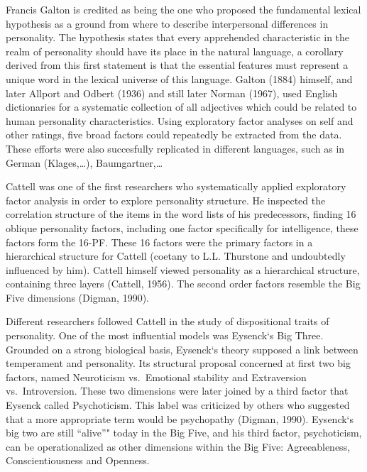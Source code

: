 \documentclass[,man]{apa6}
\theoremstyle{definition}
\theoremstyle{definition}
\theoremstyle{definition}
\theoremstyle{remark}
\begin{document}
Francis Galton is credited as being the one who proposed the fundamental
lexical hypothesis as a ground from where to describe interpersonal
differences in personality. The hypothesis states that every apprehended
characteristic in the realm of personality should have its place in the
natural language, a corollary derived from this first statement is that
the essential features must represent a unique word in the lexical
universe of this language. Galton (1884) himself, and later Allport and
Odbert (1936) and still later Norman (1967), used English dictionaries
for a systematic collection of all adjectives which could be related to
human personality characteristics. Using exploratory factor analyses on
self and other ratings, five broad factors could repeatedly be extracted
from the data. These efforts were also succesfully replicated in
different languages, such as in German (Klages,\ldots{}),
Baumgartner,\ldots{}

Cattell was one of the first researchers who systematically applied
exploratory factor analysis in order to explore personality structure.
He inspected the correlation structure of the items in the word lists of
his predecessors, finding 16 oblique personality factors, including one
factor specifically for intelligence, these factors form the 16-PF.
These 16 factors were the primary factors in a hierarchical structure
for Cattell (coetany to L.L. Thurstone and undoubtedly influenced by
him). Cattell himself viewed personality as a hierarchical structure,
containing three layers (Cattell, 1956). The second order factors
resemble the Big Five dimensions (Digman, 1990).

Different researchers followed Cattell in the study of dispositional
traits of personality. One of the most influential models was Eysenck`s
Big Three. Grounded on a strong biological basis, Eysenck`s theory
supposed a link between temperament and personality. Its structural
proposal concerned at first two big factors, named Neuroticism
vs.~Emotional stability and Extraversion vs.~Introversion. These two
dimensions were later joined by a third factor that Eysenck called
Psychoticism. This label was criticized by others who suggested that a
more appropriate term would be psychopathy (Digman, 1990). Eysenck`s big
two are still \enquote{alive}" today in the Big Five, and his third
factor, psychoticism, can be operationalized as other dimensions within
the Big Five: Agreeableness, Conscientiousness and Openness.
\end{document}
